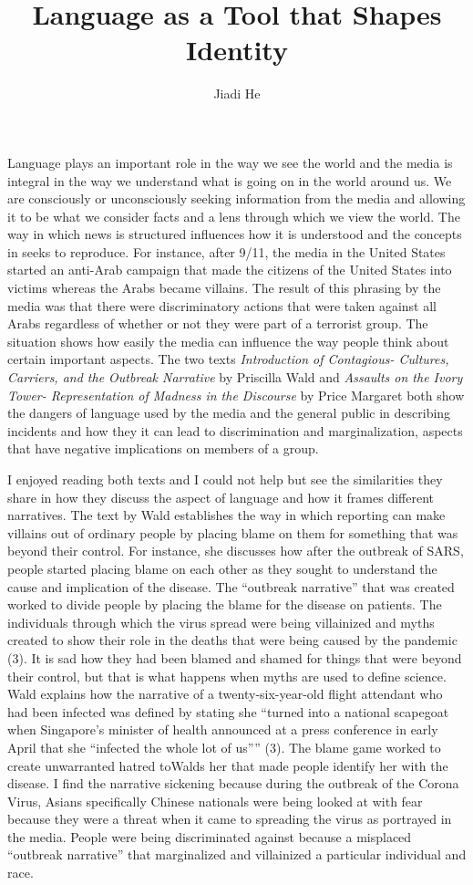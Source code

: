 \documentclass[11pt]{article}
\title{Language as a Tool that Shapes Identity}
\author{Jiadi He}
\affil{Georgetown University}
\begin{document}
\maketitle
\keywordsline

Language plays an important role in the way we see the world and the media is integral in the way we understand what is going on in the world around us. We are consciously or unconsciously seeking information from the media and allowing it to be what we consider facts and a lens through which we view the world. The way in which news is structured influences how it is understood and the concepts in seeks to reproduce. For instance, after 9/11, the media in the United States started an anti-Arab campaign that made the citizens of the United States into victims whereas the Arabs became villains. The result of this phrasing by the media was that there were discriminatory actions that were taken against all Arabs regardless of whether or not they were part of a terrorist group. The situation shows how easily the media can influence the way people think about certain important aspects. The two texts \textit{Introduction of Contagious- Cultures, Carriers, and the Outbreak Narrative} by Priscilla Wald and \textit{Assaults on the Ivory Tower- Representation of Madness in the Discourse} by Price Margaret both show the dangers of language used by the media and the general public in describing incidents and how they it can lead to discrimination and marginalization, aspects that have negative implications on members of a group.

I enjoyed reading both texts and I could not help but see the similarities they share in how they discuss the aspect of language and how it frames different narratives. The text by Wald establishes the way in which reporting can make villains out of ordinary people by placing blame on them for something that was beyond their control. For instance, she discusses how after the outbreak of SARS, people started placing blame on each other as they sought to understand the cause and implication of the disease. The “outbreak narrative” that was created worked to divide people by placing the blame for the disease on patients. The individuals through which the virus spread were being villainized and myths created to show their role in the deaths that were being caused by the pandemic (3). It is sad how they had been blamed and shamed for things that were beyond their control, but that is what happens when myths are used to define science. Wald explains how the narrative of a twenty-six-year-old flight attendant who had been infected was defined by stating she “turned into a national scapegoat when Singapore’s minister of health announced at a press conference in early April that she “infected the whole lot of us”” (3). The blame game worked to create unwarranted hatred toWalds her that made people identify her with the disease. I find the narrative sickening because during the outbreak of the Corona Virus, Asians specifically Chinese nationals were being looked at with fear because they were a threat when it came to spreading the virus as portrayed in the media. People were being discriminated against because a misplaced “outbreak narrative” that marginalized and villainized a particular individual and race.
\end{document}
